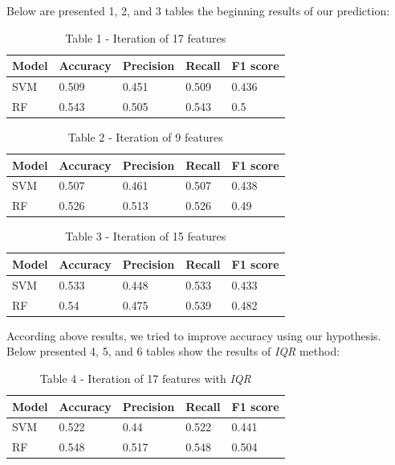 \begin{multicols}{2}
Below are presented 1, 2, and 3 tables the beginning results of our
prediction:
\end{multicols}

\begin{table}[H]
\caption*{Table 1 - Iteration of 17 features}
\centering
\begin{tabular}{|l|l|l|l|l|}
\hline
Model & Accuracy & Precision & Recall & F1 				score \\ \hline
SVM   & 0.509    & 0.451     & 0.509  & 0.436        \\ \hline
RF    & 0.543    & 0.505     & 0.543  & 0.5          \\ \hline
\end{tabular}
\end{table}

\begin{table}[H]
\caption*{Table 2 - Iteration of 9 features}
\centering
\begin{tabular}{|l|l|l|l|l|}
\hline
Model & Accuracy & Precision & Recall & F1 				score \\ \hline
SVM   & 0.507    & 0.461     & 0.507  & 0.438        \\ \hline
RF    & 0.526    & 0.513     & 0.526  & 0.49         \\ \hline
\end{tabular}
\end{table}

\begin{table}[H]
\caption*{Table 3 - Iteration of 15 features}
\centering
\begin{tabular}{|l|l|l|l|l|}
\hline
Model & Accuracy & Precision & Recall & F1 				score \\ \hline
SVM   & 0.533    & 0.448     & 0.533  & 0.433        \\ \hline
RF    & 0.54     & 0.475     & 0.539  & 0.482        \\ \hline
\end{tabular}
\end{table}

According above results, we tried to improve accuracy using our
hypothesis. Below presented 4, 5, and 6 tables show the results of
\emph{IQR} method:

\begin{table}[H]
\caption*{Table 4 - Iteration of 17 features with \emph{IQR}}
\centering
\begin{tabular}{|l|l|l|l|l|}
\hline
Model & Accuracy & Precision & Recall & F1 score \\ \hline
SVM   & 0.522    & 0.44      & 0.522  & 0.441    \\ \hline
RF    & 0.548    & 0.517     & 0.548  & 0.504    \\ \hline
\end{tabular}
\end{table}

